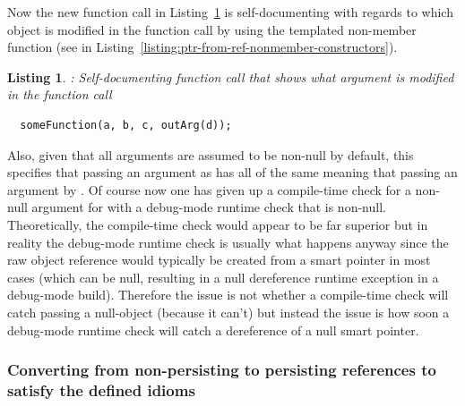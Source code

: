 \documentclass[pdf,ps2pdf,11pt]{SANDreport}
\newtheorem{listing}{Listing}
\begin{document}
Now the new function call in
Listing~\ref{listing:fun-call-ptr-changed-obj} is self-documenting
with regards to which object is modified in the function call by using
the {} templated non-member function (see
{} in
Listing~\ref{listing:ptr-from-ref-nonmember-constructors}).


{}\begin{listing}: Self-documenting function call that shows what
argument is modified in the function call
\label{listing:fun-call-ptr-changed-obj}
{\small\begin{verbatim}
  someFunction(a, b, c, outArg(d));
\end{verbatim}}
\end{listing}


Also, given that all {} arguments are assumed to be
non-null by default, this specifies that passing an argument as
{} has all of the same meaning that passing an
argument by {}.  Of course now one has given up a
compile-time check for a non-null argument for {} with a
debug-mode runtime check that {} is non-null.
Theoretically, the compile-time check would appear to be far superior
but in reality the debug-mode runtime check is usually what happens
anyway since the raw object reference would typically be created from
a smart pointer in most cases (which can be null, resulting in a null
dereference runtime exception in a debug-mode build).  Therefore the
issue is not whether a compile-time check will catch passing a
null-object (because it can't) but instead the issue is how soon a
debug-mode runtime check will catch a dereference of a null smart
pointer.



%
{}\subsubsection*{Converting from non-persisting to persisting
references to satisfy the defined idioms}
%
\end{document}

